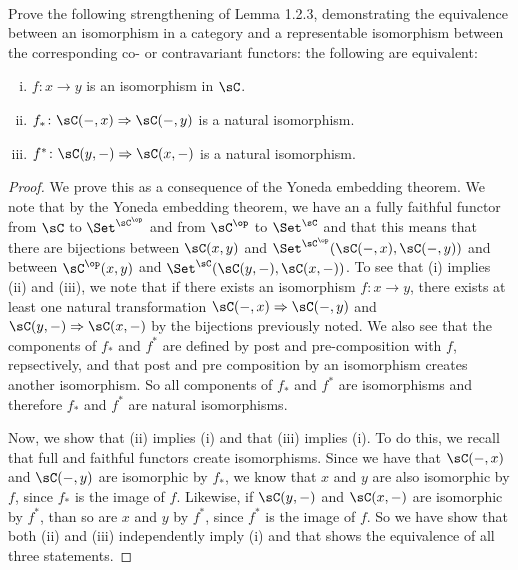 \documentclass[../../main]{subfiles}
\begin{document}
\paragraph{}
\begin{exercise}
Prove the following strengthening of Lemma 1.2.3, demonstrating the equivalence between an isomorphism in a category and a representable isomorphism between the corresponding co- or contravariant functors: the following are equivalent:
\end{exercise}

\begin{enumerate}[(i)]
\item $f\colon x \rightarrow y$ is an isomorphism in $\sC$.
\item $f_*\colon \sC(-,x) \Rightarrow \sC(-,y)$ is a natural isomorphism. 
\item $f^{*}\colon \sC(y,-) \Rightarrow \sC(x,-)$ is a natural isomorphism. 
\end{enumerate}

\begin{proof}
We prove this as a consequence of the Yoneda embedding theorem. We note that by 
the Yoneda embedding theorem, we have an a fully faithful functor from $\sC$ to 
$\Set^{\sC^{\op}}$ and from 
$\sC^{\op}$ to $\Set^{\sC}$ and that this means that there are bijections 
between $\sC(x,y)$ and $\Set^{\sC^{\op}}(\sC(-,x),\sC(-,y))$ and between  
$\sC^{\op}(x,y)$ and 
$\Set^{\sC}(\sC(y,-),\sC(x,-))$. To see that (i) implies (ii) and (iii), we 
note that if there exists an isomorphism $f\colon x \rightarrow y$, there 
exists at least 
one natural 
transformation $\sC(-,x) \Rightarrow \sC(-,y)$ and $\sC(y,-) \Rightarrow 
\sC(x,-)$ by the bijections previously noted. We also see that the components 
of $f_*$ and 
$f^{*}$ are 
defined by post and pre-composition with $f$, repsectively, and that post and 
pre composition by an isomorphism creates another isomorphism. So all 
components of $f_*$ 
and $f^{*}$ are isomorphisms and therefore $f_*$ and $f^{*}$ are natural 
isomorphisms. 

Now, we show that (ii) implies (i) and that (iii) implies (i). To do this, we 
recall that full and faithful functors create isomorphisms. Since we have that 
$\sC(-,x)$ 
and $\sC(-,y)$ are isomorphic by $f_*$, we know that $x$ and $y$ are also 
isomorphic by $f$, since $f_*$ is the image of $f$. Likewise, if $\sC(y,-)$ and 
$\sC(x,-)$ are 
isomorphic by $f^{*}$, than so are $x$ and $y$ by $f^{*}$, since $f^{*}$ is the 
image of $f$. So we have show that both (ii) and (iii) independently imply (i) 
and that shows the equivalence of all three statements.

\end{proof}
\end{document}
